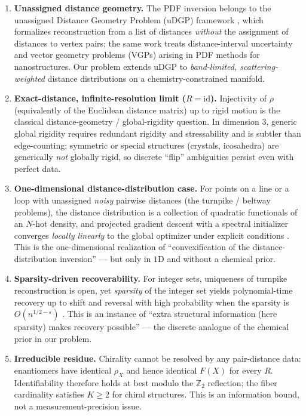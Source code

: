 \documentclass[11pt]{article}
\begin{document}
\begin{enumerate}
\item \textbf{Unassigned distance geometry.}
The PDF inversion belongs to the unassigned Distance Geometry Problem (uDGP)
framework \cite{Billinge2018}, which formalizes reconstruction from a list of
distances \emph{without} the assignment of distances to vertex pairs; the same
work treats distance-interval uncertainty and vector geometry problems (VGPs)
arising in PDF methods for nanostructures. Our problem extends uDGP to
\emph{band-limited, scattering-weighted} distance distributions on a
chemistry-constrained manifold.

\item \textbf{Exact-distance, infinite-resolution limit ($R=\mathrm{id}$).}
Injectivity of $\rho$ (equivalently of the Euclidean distance matrix) up to
rigid motion is the classical distance-geometry / global-rigidity question.
In dimension $3$, generic global rigidity requires redundant rigidity and
stressability and is subtler than edge-counting; symmetric or special
structures (crystals, icosahedra) are generically \emph{not} globally rigid,
so discrete ``flip'' ambiguities persist even with perfect data.

\item \textbf{One-dimensional distance-distribution case.}
For points on a line or a loop with unassigned \emph{noisy} pairwise
distances (the turnpike / beltway problems), the distance distribution is a
collection of quadratic functionals of an $N$-hot density, and projected
gradient descent with a spectral initializer converges \emph{locally
linearly} to the global optimizer under explicit conditions
\cite{HuangDokmanic2021}. This is the one-dimensional realization of
``convexification of the distance-distribution inversion'' --- but only in
$1$D and without a chemical prior.

\item \textbf{Sparsity-driven recoverability.}
For integer sets, uniqueness of turnpike reconstruction is open, yet
\emph{sparsity} of the integer set yields polynomial-time recovery up to
shift and reversal with high probability when the sparsity is
$O(n^{1/2-\varepsilon})$ \cite{JaganathanHassibi2012}. This is an instance of
``extra structural information (here sparsity) makes recovery possible'' ---
the discrete analogue of the chemical prior in our problem.

\item \textbf{Irreducible residue.}
Chirality cannot be resolved by any pair-distance data: enantiomers have
identical $\rho_X$ and hence identical $F(X)$ for every $R$. Identifiability
therefore holds at best modulo the $\mathbb{Z}_2$ reflection; the fiber
cardinality satisfies $K\ge 2$ for chiral structures. This is an information
bound, not a measurement-precision issue.
\end{enumerate}
\end{document}
